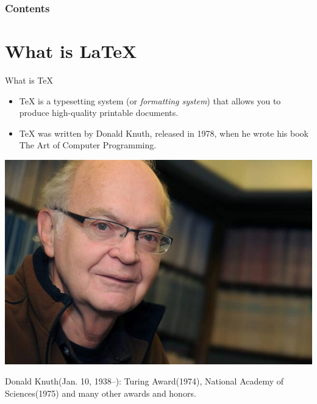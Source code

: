 \documentclass[10pt]{beamer}
\begin{document}
\begin{frame}
  \maketitle
\end{frame}

\begin{frame}\frametitle<presentation>{Contents}
  \tableofcontents
\end{frame}

\section{What is \LaTeX}
\begin{frame}{What is \TeX}
\begin{itemize}
    \item \TeX{} is a typesetting system (or {\em formatting system}) 
    that allows you to produce high-quality printable documents.

    \item \TeX{} was written by Donald Knuth, released in 1978,
    when he wrote his book \alert{The Art of Computer Programming}.
\end{itemize}
\begin{center}
    \includegraphics[width=.55\textwidth]{Donald-Knuth.jpg}
\end{center}
    Donald Knuth(Jan. 10, 1938--): Turing Award(1974),
    National Academy of Sciences(1975) and many other awards and honors.
\end{frame}
\end{document}
